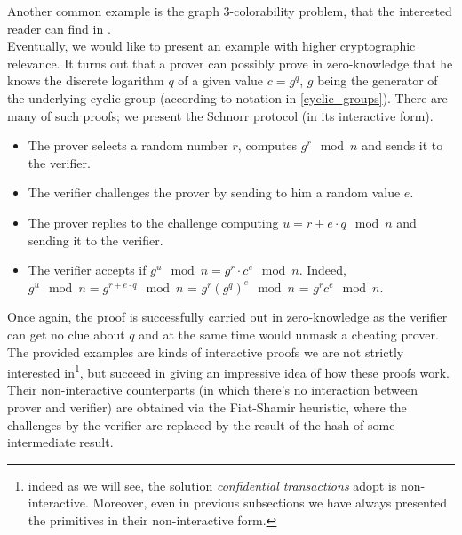 Another common example is the graph 3-colorability problem, that the interested reader can find in \cite{PedroFranco}.\\
Eventually, we would like to present an example with higher cryptographic relevance. It turns out that a prover can possibly prove in zero-knowledge that he knows the discrete logarithm $q$ of a given value $c = g^q$, $g$ being the generator of the underlying cyclic group (according to notation in \ref{cyclic_groups}). There are many of such proofs; we present the Schnorr protocol (in its interactive form).
\begin{itemize}
    \item The prover selects a random number $r$, computes $g^r \mod{n}$ and sends it to the verifier.
    \item The verifier challenges the prover by sending to him a random value $e$. 
    \item The prover replies to the challenge computing $u = r + e\cdot q \mod{n} $ and sending it to the verifier.
    \item The verifier accepts if $g^u \mod{n} = g^r\cdot c^e \mod{n}$. Indeed, $g^u \mod{n} = g^{r + e\cdot q} \mod{n}$ = $g^r {(g^q)}^e \mod{n}$ = $g^r c^e \mod{n}$.
\end{itemize}
Once again, the proof is successfully carried out in zero-knowledge as the verifier can get no clue about $q$ and at the same time would unmask a cheating prover.\\ 
The provided examples are kinds of interactive proofs we are not strictly interested in\footnote{indeed as we will see, the solution \textit{confidential transactions} adopt is non-interactive. Moreover, even in previous subsections we have always presented the primitives in their non-interactive form.}, but succeed in giving an impressive idea of how these proofs work. Their non-interactive counterparts (in which there's no interaction between prover and verifier) are obtained via the Fiat-Shamir heuristic, where the challenges by the verifier are replaced by the result of the hash of some intermediate result. 

